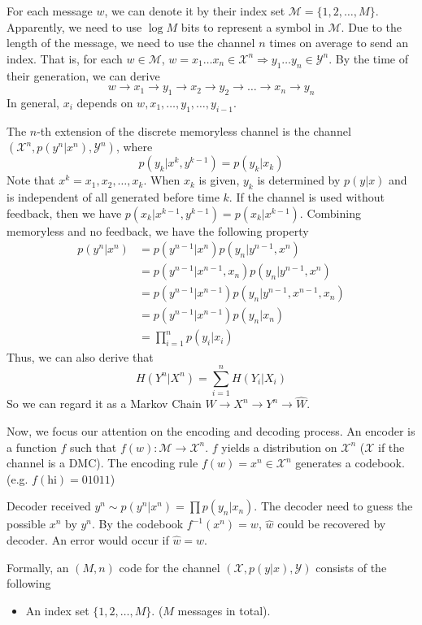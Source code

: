 \documentclass[10pt,landscape, a4paper]{article}
\begin{document}
\begin{multicols}{3}
For each message $w$, we can denote it by their index set $\mathcal{M}=\{1,2,\dots, M\}$. Apparently, we need to use $\log M$ bits to represent a symbol in $\mathcal{M}$. Due to the length of the message, we need to use the channel $n$ times on average to send an index. That is, for each $w\in \mathcal{M}$, $w=x_1\dots x_n\in\mathcal{X}^n\Rightarrow y_1\dots y_n\in\mathcal{Y}^n$. By the time of their generation, we can derive
$$
w\rightarrow x_1\rightarrow y_1\rightarrow x_2\rightarrow y_2\rightarrow \dots\rightarrow x_n\rightarrow y_n
$$
In general, $x_i$ depends on $w,x_1,\dots, y_1, \dots, y_{i-1}$.

The $n$-th extension of the discrete memoryless channel is the channel $(\mathcal{X}^n, p(y^n|x^n), \mathcal{Y}^n)$, where
$$
p(y_k|x^k, y^{k-1})=p(y_k|x_k)
$$
Note that $x^k=x_1,x_2,\dots, x_k$. When $x_k$ is given, $y_k$ is determined by $p(y|x)$ and is independent of all generated before time $k$. If the channel is used without feedback, then we have $p(x_k|x^{k-1}, y^{k-1})=p(x_k|x^{k-1})$. Combining memoryless and no feedback, we have the following property
$$
\begin{aligned}
p(y^n|x^n)&=p(y^{n-1}|x^n)p(y_n|y^{n-1},x^n)\\
&=p(y^{n-1}|x^{n-1},x_n)p(y_n|y^{n-1},x^n)\\
&=p(y^{n-1}|x^{n-1})p(y_n|y^{n-1},x^{n-1},x_n)\\
&=p(y^{n-1}|x^{n-1})p(y_n|x_n)\\
&=\prod_{i=1}^n p(y_i|x_i)
\end{aligned}
$$
Thus, we can also derive that
$$
H(Y^n|X^n)=\sum_{i=1}^nH(Y_i|X_i)
$$
So we can regard it as a Markov Chain $W\rightarrow X^n\rightarrow Y^n\rightarrow \hat{W}$. 

Now, we focus our attention on the encoding and decoding process. An encoder is a function $f$ such that $f(w):\mathcal{M}\rightarrow \mathcal{X}^n$. $f$ yields a distribution on $\mathcal{X}^n$ ($\mathcal{X}$ if the channel is a DMC). The encoding rule $f(w)=x^n\in\mathcal{X}^n$ generates a codebook. (e.g. $f(\text{hi})=01011$)

Decoder received $y^n\sim p(y^n|x^n)=\prod p(y_n|x_n)$. The decoder need to guess the possible $x^n$ by $y^n$. By the codebook $f^{-1}(x^n)=w$, $\widehat{w}$ could be recovered by decoder. An error would occur if $\widehat{w}=w$.

Formally, an $(M,n)$ code for the channel $(\mathcal{X}, p(y|x), \mathcal{Y})$ consists of the following

\begin{itemize}
    \item An index set $\{1,2,\dots, M\}$. ($M$ messages in total).


\end{itemize}
\end{multicols}
\end{document}
